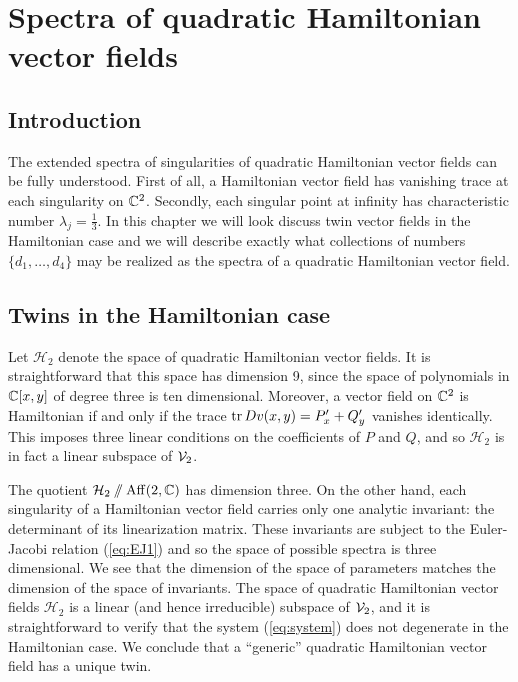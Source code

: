 \documentclass[phd,tocprelim]{cornell}
\begin{document}
\appendix
\chapter{Spectra of quadratic Hamiltonian vector fields}

\section{Introduction}

The extended spectra of singularities of quadratic Hamiltonian vector fields can be fully understood. First of all, a Hamiltonian vector field has vanishing trace at each singularity on $\mathbb{C}^2$. Secondly, each singular point at infinity has characteristic number $\lambda_j=\frac{1}{3}$. In this chapter we will look discuss twin vector fields in the Hamiltonian case and we will describe exactly what collections of numbers $\{d_1,\ldots,d_4\}$ may be realized as the spectra of a quadratic Hamiltonian vector field.




\section{Twins in the Hamiltonian case}

Let $\mathcal{H}_2$ denote the space of quadratic Hamiltonian vector fields. It is straightforward that this space has dimension 9, since the space of polynomials in $\mathbb{C}[x,y]$ of degree three is ten dimensional. Moreover, a vector field on $\mathbb{C}^2$ is Hamiltonian if and only if the trace $\operatorname{tr}{Dv(x,y)}=P'_x+Q'_y$ vanishes identically. This imposes three linear conditions on the coefficients of $P$ and $Q$, and so $\mathcal{H}_2$ is in fact a linear subspace of $\mathcal{V}_2$.


The quotient $\mathcal{H}_2\sslash\operatorname{Aff}({2},{\mathbb{C}})$ has dimension three. On the other hand, each singularity of a Hamiltonian vector field carries only one analytic invariant: the determinant of its linearization matrix. These invariants are subject to the Euler-Jacobi relation (\ref{eq:EJ1}) and so the space of possible spectra is three dimensional. We see that the dimension of the space of parameters matches the dimension of the space of invariants. The space of quadratic Hamiltonian vector fields $\mathcal{H}_2$ is a linear (and hence irreducible) subspace of $\mathcal{V}_2$, and it is straightforward to verify that the system (\ref{eq:system}) does not degenerate in the Hamiltonian case. We conclude that a ``generic'' quadratic Hamiltonian vector field has a unique twin.
\end{document}
